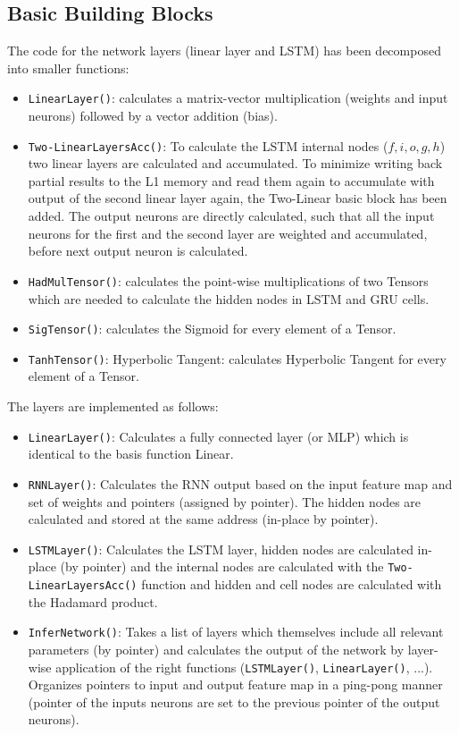 \subsection{Basic Building Blocks}
The code for the network layers (linear layer and LSTM) has been decomposed into smaller functions:
\begin{itemize}
\item \texttt{LinearLayer()}: calculates a matrix-vector multiplication (weights and input neurons) followed by a vector addition (bias).
\item \texttt{Two-LinearLayersAcc()}: To calculate the LSTM internal nodes ($f,i,o,g,h$) two linear layers are calculated and accumulated. To minimize writing back partial results to the L1 memory and read them again to accumulate with output of the second linear layer again, the Two-Linear basic block has been added. The output neurons are directly calculated, such that all the input neurons for the first and the second layer are weighted and accumulated, before next output neuron is calculated.
\item \texttt{HadMulTensor()}: calculates the point-wise multiplications of two Tensors which are needed to calculate the hidden nodes in LSTM and GRU cells.
\item \texttt{SigTensor()}: calculates the Sigmoid for every element of a Tensor.
\item \texttt{TanhTensor()}: Hyperbolic Tangent: calculates Hyperbolic Tangent for every element of a Tensor.
\end{itemize}

The layers are implemented as follows:
\begin{itemize}
    \item \texttt{LinearLayer()}: Calculates a fully connected layer (or MLP) which is identical to the basis function Linear.
    \item \texttt{RNNLayer()}: Calculates the RNN output based on the input feature map and set of weights and pointers (assigned by pointer). The hidden nodes are calculated and stored at the same address (in-place by pointer).
    \item \texttt{LSTMLayer()}: Calculates the LSTM layer, hidden nodes are calculated in-place (by pointer) and the internal nodes are calculated with the \texttt{Two-LinearLayersAcc()} function and hidden and cell nodes are calculated with the Hadamard product.
   \item \texttt{InferNetwork()}: Takes a list of layers which themselves include all relevant parameters (by pointer) and calculates the output of the network by layer-wise application of the right functions (\texttt{LSTMLayer()}, \texttt{LinearLayer()}, ...). Organizes pointers to input and output feature map in a ping-pong manner (pointer of the inputs neurons are set to the previous pointer of the output neurons).
\end{itemize}

